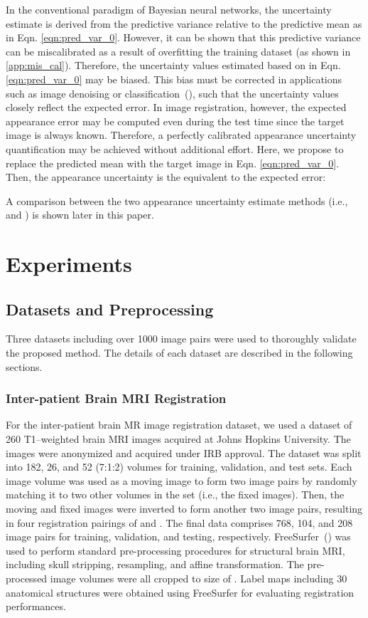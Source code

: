 \documentclass[times,twocolumn,final]{elsarticle}
\begin{document}
In the conventional paradigm of Bayesian neural networks, the uncertainty estimate is derived from the predictive variance  relative to the predictive mean  as in Eqn. \ref{eqn:pred_var_0}. However, it can be shown that this predictive variance can be miscalibrated as a result of overfitting the training dataset (as shown in \ref{app:mis_cal}). Therefore, the uncertainty values estimated based on  in Eqn. \ref{eqn:pred_var_0} may be biased. This bias must be corrected in applications such as image denoising or classification~(\cite{laves2019well, guo2017calibration, kuleshov2018accurate, phan2018calibrating, laves2020uncertainty, pmlr-v121-laves20a}), such that the uncertainty values closely reflect the expected error. In image registration, however, the expected appearance error may be computed even during the test time since the target image is always known. Therefore, a perfectly calibrated appearance uncertainty quantification may be achieved without additional effort. Here, we propose to replace the predicted mean  with the target image  in Eqn. \ref{eqn:pred_var_0}. Then, the appearance uncertainty is the equivalent to the expected error:
\begin{linenomath}

\end{linenomath}
A comparison between the two appearance uncertainty estimate methods (i.e.,  and ) is shown later in this paper.

\section{Experiments}
\label{sec:experiments}
\subsection{Datasets and Preprocessing}
Three datasets including over 1000 image pairs were used to thoroughly validate the proposed method. The details of each dataset are described in the following sections.
\subsubsection{Inter-patient Brain MRI Registration}
For the inter-patient brain MR image registration dataset, we used a dataset of 260 T1–weighted brain MRI images acquired at Johns Hopkins University. The images were anonymized and acquired under IRB approval. The dataset was split into 182, 26, and 52 (7:1:2) volumes for training, validation, and test sets. Each image volume was used as a moving image to form two image pairs by randomly matching it to two other volumes in the set (i.e., the fixed images). Then, the moving and fixed images were inverted to form another two image pairs, resulting in four registration pairings of  and . The final data comprises 768, 104, and 208 image pairs for training, validation, and testing, respectively. FreeSurfer~(\cite{fischl2012freesurfer}) was used to perform standard pre-processing procedures for structural brain MRI, including skull stripping, resampling, and affine transformation. The pre-processed image volumes were all cropped to size of . Label maps including 30 anatomical structures were obtained using FreeSurfer for evaluating registration performances.
\end{document}
